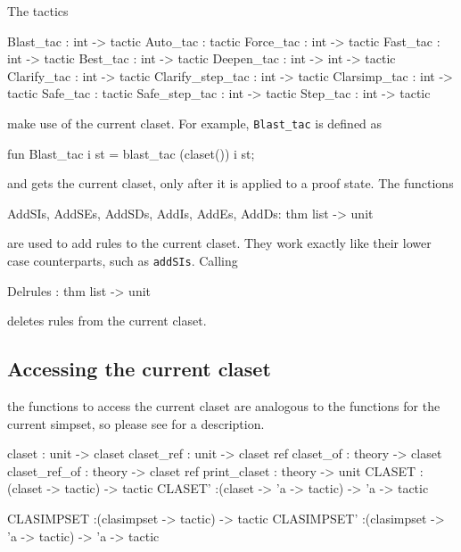 The tactics
\begin{ttbox}
Blast_tac        : int -> tactic
Auto_tac         :        tactic
Force_tac        : int -> tactic
Fast_tac         : int -> tactic
Best_tac         : int -> tactic
Deepen_tac       : int -> int -> tactic
Clarify_tac      : int -> tactic
Clarify_step_tac : int -> tactic
Clarsimp_tac     : int -> tactic
Safe_tac         :        tactic
Safe_step_tac    : int -> tactic
Step_tac         : int -> tactic
\end{ttbox}
%
make use of the current claset.  For example, \texttt{Blast_tac} is defined as 
\begin{ttbox}
fun Blast_tac i st = blast_tac (claset()) i st;
\end{ttbox}
and gets the current claset, only after it is applied to a proof state.  
The functions
\begin{ttbox}
AddSIs, AddSEs, AddSDs, AddIs, AddEs, AddDs: thm list -> unit
\end{ttbox}
  
  
are used to add rules to the current claset.  They work exactly like their
lower case counterparts, such as \texttt{addSIs}.  Calling
\begin{ttbox}
Delrules : thm list -> unit
\end{ttbox}
deletes rules from the current claset. 


\subsection{Accessing the current claset}
\label{sec:access-current-claset}

the functions to access the current claset are analogous to the functions 
for the current simpset, so please see \label{sec:access-current-simpset}
for a description.
\begin{ttbox}
claset        : unit   -> claset
claset_ref    : unit   -> claset ref
claset_of     : theory -> claset
claset_ref_of : theory -> claset ref
print_claset  : theory -> unit
CLASET        :(claset     ->       tactic) ->       tactic
CLASET'       :(claset     -> 'a -> tactic) -> 'a -> tactic

CLASIMPSET    :(clasimpset ->       tactic) ->       tactic
CLASIMPSET'   :(clasimpset -> 'a -> tactic) -> 'a -> tactic
\end{ttbox}


